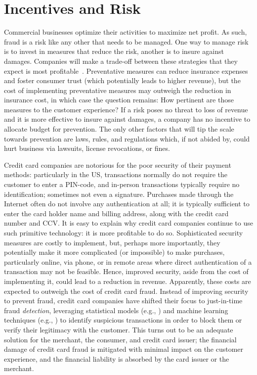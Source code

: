 \documentclass[conference]{IEEEtran}
\begin{document}
\section{Incentives and Risk}
Commercial businesses optimize their activities to maximize net profit. As such, fraud is a risk like any other that needs to be managed. One way to manage risk is to invest in measures that reduce the risk, another is to insure against damages. Companies will make a trade-off between these strategies that they expect is most profitable~\cite{bohme2010security, anderson2006economics}. Preventative measures can reduce insurance expenses and foster consumer trust (which potentially leads to higher revenue), but the cost of implementing preventative measures may outweigh the reduction in insurance cost, in which case the question remains: How pertinent are those measures to the customer experience? If a risk poses no threat to loss of revenue and it is more effective to insure against damages, a company has no incentive to allocate budget for prevention. The only other factors that will tip the scale towards prevention are laws, rules, and regulations which, if not abided by, could hurt business via lawsuits, license revocations, or fines.

Credit card companies are notorious for the poor security of their payment methods: particularly in the US, transactions normally do not require the customer to enter a PIN-code, and in-person transactions typically require no identification; sometimes not even a signature. Purchases made through the Internet often do not involve any authentication at all; it is typically sufficient to enter the card holder name and billing address, along with the credit card number and CCV. It is easy to explain why credit card companies continue to use such primitive technology: it is more profitable to do so. Sophisticated security measures are costly to implement, but, perhaps more importantly, they potentially make it more complicated (or impossible) to make purchases, particularly online, via phone, or in remote areas where direct authentication of a transaction may not be feasible. Hence, improved security, aside from the cost of implementing it, could lead to a reduction in revenue. Apparently, these costs are expected to outweigh the cost of credit card fraud. Instead of improving security to prevent fraud, credit card companies have shifted their focus to just-in-time fraud \emph{detection}, leveraging statistical models (e.g., \cite{4358713}) and machine learning techniques (e.g., \cite{maes2002credit}) to identify suspicious transactions in order to block them or verify their legitimacy with the customer. This turns out to be an adequate solution for the merchant, the consumer, and credit card issuer; the financial damage of credit card fraud is mitigated with minimal impact on the customer experience, and the financial liability is absorbed by the card issuer or the merchant.
\end{document}
